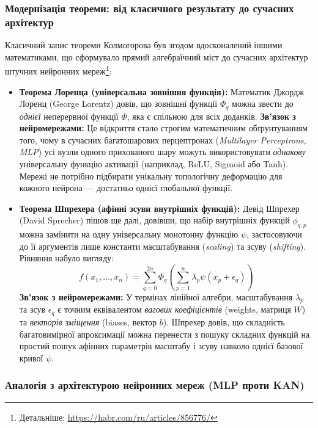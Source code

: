 \documentclass[12pt,a4paper]{article}
\begin{document}
	\subsubsection*{Модернізація теореми: від класичного результату до сучасних архітектур}
	
	Класичний запис теореми Колмогорова був згодом вдосконалений іншими математиками, що сформувало прямий алгебраїчний міст до сучасних архітектур штучних нейронних мереж\footnote{Детальніше: \url{https://habr.com/ru/articles/856776/}}:
	
	\begin{itemize}
		\item \textbf{Теорема Лоренца (універсальна зовнішня функція):} 
		Математик Джордж Лоренц (George Lorentz) довів, що зовнішні функції $\Phi_q$ можна звести до \textit{однієї} неперервної функції $\Phi$, яка є спільною для всіх доданків. 
		\newline \textbf{Зв'язок з нейромережами:} Це відкриття стало строгим математичним обґрунтуванням того, чому в сучасних багатошарових перцептронах (\textit{Multilayer Perceptrons, MLP}) усі вузли одного прихованого шару можуть використовувати \textit{однакову} універсальну функцію активації (наприклад, ReLU, Sigmoid або Tanh). Мережі не потрібно підбирати унікальну топологічну деформацію для кожного нейрона — достатньо однієї глобальної функції.
		
		\item \textbf{Теорема Шпрехера (афінні зсуви внутрішніх функцій):} 
		Девід Шпрехер (David Sprecher) пішов ще далі, довівши, що набір внутрішніх функцій $\phi_{q,p}$ можна замінити на одну універсальну монотонну функцію $\psi$, застосовуючи до її аргументів лише константи масштабування (\textit{scaling}) та зсуву (\textit{shifting}). Рівняння набуло вигляду:
		$$f(x_1, \dots, x_n) = \sum_{q=0}^{2n} \Phi_q \left( \sum_{p=1}^n \lambda_p \psi(x_p + \epsilon_q) \right)$$
		\textbf{Зв'язок з нейромережами:} У термінах лінійної алгебри, масштабування $\lambda_p$ та зсув $\epsilon_q$ є точним еквівалентом \textit{вагових коефіцієнтів} (weights, матриця $W$) та \textit{векторів зміщення} (biases, вектор $b$). Шпрехер довів, що складність багатовимірної апроксимації можна перенести з пошуку складних функцій на простий пошук афінних параметрів масштабу і зсуву навколо однієї базової кривої $\psi$.
	\end{itemize}
	
	\subsubsection*{Аналогія з архітектурою нейронних мереж (MLP проти KAN)}
	
\end{document}
